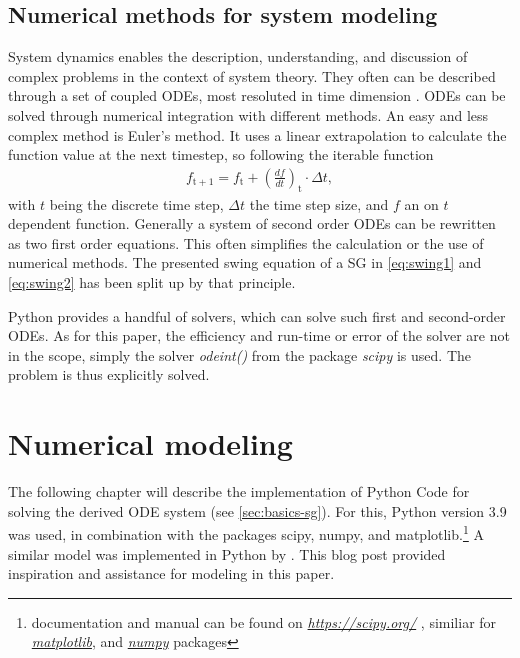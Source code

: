 \section{Numerical methods for system modeling}
\label{sec:numerical-methods}

System dynamics enables the description, understanding, and discussion of complex problems in the context of system theory. They often can be described through a set of coupled \acfp{ODE}, most resoluted in time dimension \autocite{georgievNumericalAnalysisTime2022}. \acsp{ODE} can be solved through numerical integration with different methods. An easy and less complex method is Euler's method. It uses a linear extrapolation to calculate the function value at the next timestep, so following the iterable function \autocite{georgievNumericalAnalysisTime2022}
\begin{align}
        f_\mathrm{t+1}=f_\mathrm{t}+\left(\frac{df}{dt}\right)_\mathrm{t} \cdot \Delta t \label{eq:euler},
\end{align}
with $t$ being the discrete time step, $\Delta t$ the time step size, and $f$ an on $t$ dependent function. Generally a system of second order \acsp{ODE} can be rewritten as two first order equations. This often simplifies the calculation or the use of numerical methods. The presented swing equation of a \acs{SG} in \autoref{eq:swing1} and \autoref{eq:swing2} has been split up by that principle. \autocite{georgievNumericalAnalysisTime2022,griffithsNumericalMethodsOrdinary2010,milesNumericalMethodsPython2023}

Python provides a handful of solvers, which can solve such first and second-order \acsp{ODE}. As for this paper, the efficiency and run-time or error of the solver are not in the scope, simply the solver {\itshape odeint()} from the package {\itshape scipy} is used. The problem is thus explicitly solved. 

\chapter{Numerical modeling}
\label{chap:methods}

The following chapter will describe the implementation of Python Code for solving the derived \acs{ODE} system (see \autoref{sec:basics-sg}). For this, Python version 3.9 was used, in combination with the packages scipy, numpy, and matplotlib.\footnote{documentation and manual can be found on \href{https://scipy.org/}{\itshape https://scipy.org/} \autocite{virtanenSciPyFundamentalAlgorithms2020}, similiar for \href{https://matplotlib.org/}{\itshape matplotlib}, and \href{https://numpy.org/}{\itshape numpy} packages} A similar model was implemented in Python by \textcite{kordowichWattsDynamicPower2023}. This blog post provided inspiration and assistance for modeling in this paper.

